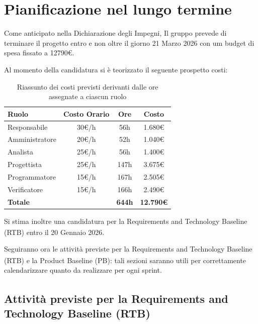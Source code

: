 \documentclass[a4paper,12pt]{article}
\begin{document}
\newpage

\section{Pianificazione nel lungo termine}

Come anticipato nella Dichiarazione degli Impegni, Il gruppo prevede di terminare il progetto entro e non oltre il giorno 21 Marzo 2026 con um budget di spesa fissato a 12790€.

Al momento della candidatura si è teorizzato il seguente prospetto costi:

\begin{table}[H]
\centering
\begin{tabular}{|l|c|c|c|}
\hline
\textbf{Ruolo} & \textbf{Costo Orario} & \textbf{Ore} & \textbf{Costo} \\
\hline
Responsabile & 30€/h & 56h & 1.680€ \\
\hline
Amministratore & 20€/h & 52h & 1.040€ \\
\hline
Analista & 25€/h & 56h & 1.400€ \\
\hline
Progettista & 25€/h & 147h & 3.675€ \\
\hline
Programmatore & 15€/h & 167h & 2.505€ \\
\hline
Verificatore & 15€/h & 166h & 2.490€ \\
\hline
\textbf{Totale} & & \textbf{644h} & \textbf{12.790€} \\
\hline
\end{tabular}
\caption{Riassunto dei costi previsti derivanti dalle ore assegnate a ciascun ruolo}
\label{tab:costi-previsti}
\end{table}

Si stima inoltre una candidatura per la Requirements and Technology Baseline\textsubscript{} (RTB) entro il 20 Gennaio 2026.

Seguiranno ora le attività previste per la Requirements and Technology Baseline\textsubscript{} (RTB) e la Product Baseline (PB): tali sezioni saranno utili per correttamente calendarizzare quanto da realizzare per ogni sprint\textsubscript{}.

\subsection{Attività previste per la Requirements and Technology Baseline\textsubscript{} (RTB)}
\end{document}
